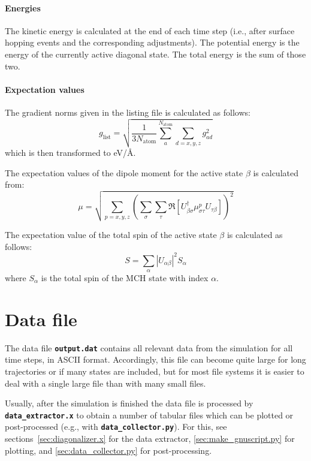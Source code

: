 \documentclass[a4paper,10pt,DIV=15,openany]{scrbook}
\newcommand{\ttt}[1]{\textbf{\texttt{#1}}}
\begin{document}
\paragraph{Energies}

The kinetic energy is calculated at the end of each time step (i.e., after surface hopping events and the corresponding adjustments). The potential energy is the energy of the currently active diagonal state. The total energy is the sum of those two.

\paragraph{Expectation values}

The gradient norms given in the listing file is calculated as follows:
\begin{equation}
  g_\text{list}=\sqrt{\frac{1}{3N_\text{atom}}\sum\limits_a^{N_\text{atom}}\sum_{d=x,y,z} g_{ad}^2}
\end{equation}
which is then transformed to eV/\AA.

The expectation values of the dipole moment for the active state $\beta$ is calculated from:
\begin{equation}
  \mu=\sqrt{\sum\limits_{p=x,y,z} 
  \left(
    \sum\limits_\sigma\sum\limits_\tau
    \Re\left[
      U_{\beta\sigma}^\dagger \mu_{\sigma\tau}^p U_{\tau\beta}
    \right]
  \right)^2}
\end{equation}

The expectation value of the total spin of the active state $\beta$ is calculated as follows:
\begin{equation}
  S=\sum_\alpha |U_{\alpha\beta}|^2 S_\alpha
\end{equation}
where $S_\alpha$ is the total spin of the MCH state with index $\alpha$.

\section{Data file}\label{sec:datfile}

The data file \ttt{output.dat} contains all relevant data from the simulation for all time steps, in ASCII format. Accordingly, this file can become quite large for long trajectories or if many states are included, but for most file systems it is easier to deal with a single large file than with many small files.

Usually, after the simulation is finished the data file is processed by \ttt{data\_extractor.x} to obtain a number of tabular files which can be plotted or post-processed (e.g., with \ttt{data\_collector.py}). For this, see sections~\ref{sec:diagonalizer.x} for the data extractor, \ref{sec:make_gnuscript.py} for plotting, and \ref{sec:data_collector.py} for post-processing.
\end{document}
